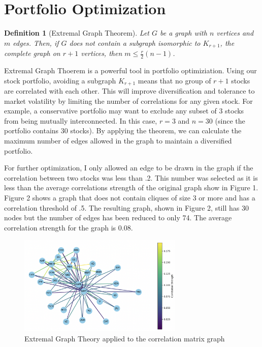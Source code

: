 \documentclass{article}
\newtheorem{definition}[theorem]{Definition}
\begin{document}
\section{Portfolio Optimization}

\begin{definition}[Extremal Graph Theorem] Let $G$ be a graph with $n$ vertices and $m$ edges. Then, if $G$ does not contain a subgraph isomorphic to $K_{r+1}$, the complete graph on $r+1$ vertices, then $m \leq \frac{r}{2}(n-1)$.
\end{definition}

Extremal Graph Thoerem is a powerful tool in portfolio optimiziation. Using our stock portfolio, avoiding a subgraph $K_{r+1}$ means that no group of $r+1$ stocks are correlated with each other. This will improve diversification and tolerance to market volatility by limiting the number of correlations for any given stock. For example, a conservative portfolio may want to exclude any subset of 3 stocks from being mutually interconnected. In this case, $r = 3$ and $n = 30$ (since the portfolio contains 30 stocks). By applying the theorem, we can calculate the maximum number of edges allowed in the graph to maintain a diversified portfolio.

For further optimization, I only allowed an edge to be drawn in the graph if the correlation between two stocks was less than .2. This number was selected as it is less than the average correlations strength of the original graph show in Figure 1. Figure 2 shows a graph that does not contain cliques of size 3 or more and has a correlation threshold of .5. The resulting graph, shown in Figure 2, still has 30 nodes but the number of edges has been reduced to only 74. The average correlation strength for the graph is 0.08.

\begin{figure}[h]
    \caption{Extremal Graph Theory applied to the correlation matrix graph}
    \centering
    \includegraphics[width=0.7\textwidth]{extremal_graph_theory.png}
\end{figure}    
\end{document}
